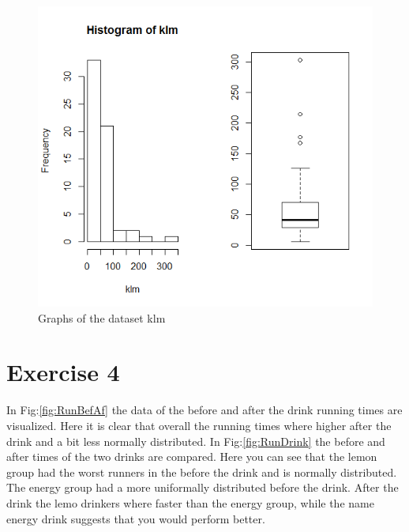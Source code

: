 \documentclass{article}
\begin{document}
    \begin{figure}
      \includegraphics[scale=0.6]{../results/resultKLM.png}
      \caption{Graphs of the dataset klm}
      \label{fig:GraphKLM}
    \end{figure}

  \section{Exercise 4}
    In Fig:\ref{fig:RunBefAf} the data of the before and after the drink running times are visualized.
    Here it is clear that overall the running times where higher after the drink and a bit less normally distributed.
    In Fig:\ref{fig:RunDrink} the before and after times of the two drinks are compared.
    Here you can see that the lemon group had the worst runners in the before the drink and is normally distributed.
    The energy group had a more uniformally distributed before the drink.
    After the drink the lemo drinkers where faster than the energy group, while the name energy drink suggests that you would perform better.
\end{document}

